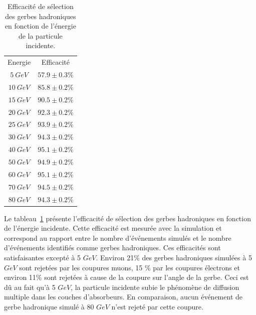 \begin{table}[!ht]
  \begin{center}
    \begin{tabular}{c|c}
      \rowcolor{black!20!white}Energie & Efficacité \\
      \rowcolor{black!5!white}\hline
      \rowcolor{black!5!white}$5 ~GeV$ & $57.9\pm0.3\%$  \\
      \rowcolor{black!5!white}$10~GeV$ & $85.8\pm0.2\%$ \\
      \rowcolor{black!5!white}$15~GeV$ & $90.5\pm0.2\%$ \\
      \rowcolor{black!5!white}$20~GeV$ & $92.3\pm0.2\%$ \\
      \rowcolor{black!5!white}$25~GeV$ & $93.9\pm0.2\%$ \\
      \rowcolor{black!5!white}$30~GeV$ & $94.3\pm0.2\%$ \\
      \rowcolor{black!5!white}$40~GeV$ & $95.1\pm0.2\%$ \\
      \rowcolor{black!5!white}$50~GeV$ & $94.9\pm0.2\%$ \\
      \rowcolor{black!5!white}$60~GeV$ & $95.1\pm0.2\%$ \\
      \rowcolor{black!5!white}$70~GeV$ & $94.5\pm0.2\%$ \\
      \rowcolor{black!5!white}$80~GeV$ & $94.3\pm0.2\%$ \\
    \end{tabular}
  \end{center}  
  \caption{Efficacité de sélection des gerbes hadroniques en fonction de l'énergie de la particule incidente.}
  \label{tab.pi-selection}
\end{table}
Le tableau~\ref{tab.pi-selection} présente l'efficacité de sélection des gerbes hadroniques en fonction de l'énergie incidente. Cette efficacité est mesurée avec la simulation et correspond au rapport entre le nombre d'événements simulés et le nombre d'événements identifiés comme gerbes hadroniques. Ces efficacités sont satisfaisantes excepté à 5 $GeV$. Environ 21$\%$ des gerbes hadroniques simulées à 5 $GeV$ sont rejetées par les coupures muons, 15 $\%$ par les coupures électrons et environ 11$\%$ sont rejetées à cause de la coupure sur l'angle de la gerbe. Ceci est dû au fait qu'à 5 $GeV$, la particule incidente subie le phénomène de diffusion multiple dans les couches d'absorbeurs. En comparaison, aucun événement de gerbe hadronique simulé à 80 $GeV$ n'est rejeté par cette coupure.
